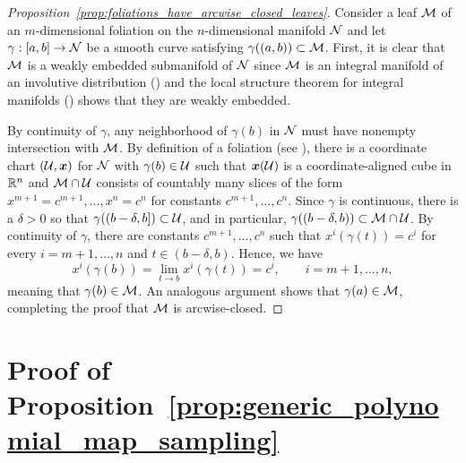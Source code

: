 \documentclass[twoside,11pt]{article}
\begin{document}
\begin{proof}[Proposition~\ref{prop:foliations_have_arcwise_closed_leaves}]
    Consider a leaf ${\mathcal{M}}$ of an $m$-dimensional foliation on the $n$-dimensional manifold ${\mathcal{N}}$ and let $\gamma:[a,b] \to {\mathcal{N}}$ be a smooth curve satisfying $\gamma((a,b)) \subset {\mathcal{M}}$.
    First, it is clear that ${\mathcal{M}}$ is a weakly embedded submanifold of ${\mathcal{N}}$ since ${\mathcal{M}}$ is an integral manifold of an involutive distribution (\citet[Proposition~19.19]{Lee2013introduction}) and the local structure theorem for integral manifolds (\citet[Proposition~19.16]{Lee2013introduction}) shows that they are weakly embedded.
    
    By continuity of $\gamma$, any neighborhood of $\gamma(b)$ in ${\mathcal{N}}$ must have nonempty intersection with ${\mathcal{M}}$.
    By definition of a foliation (see \cite{Lee2013introduction}), there is a coordinate chart $({\mathcal{U}}, {\boldsymbol{x}})$ for ${\mathcal{N}}$ with $\gamma(b) \in {\mathcal{U}}$ such that ${\boldsymbol{x}}({\mathcal{U}})$ is a coordinate-aligned cube in $\mathbb{R}^n$ and ${\mathcal{M}} \cap {\mathcal{U}}$ consists of countably many slices of the form $x^{m+1} = c^{m+1}, \ldots, x^{n} = c^n$ for constants $c^{m+1}, \ldots, c^n$.
    Since $\gamma$ is continuous, there is a $\delta > 0$ so that $\gamma((b-\delta, b]) \subset {\mathcal{U}}$, and in particular, $\gamma((b-\delta, b)) \subset {\mathcal{M}} \cap {\mathcal{U}}$.
    By continuity of $\gamma$, there are constants $c^{m+1}, \ldots, c^n$ such that $x^{i}(\gamma(t)) = c^{i}$ for every $i=m+1,\ldots, n$ and $t \in (b-\delta, b)$.
    Hence, we have
    \begin{equation}
        x^i(\gamma(b)) = \lim_{t\to b} x^i(\gamma(t)) = c^i, \qquad i=m+1, \ldots, n,
    \end{equation}
    meaning that $\gamma(b) \in {\mathcal{M}}$.
    An analogous argument shows that $\gamma(a) \in {\mathcal{M}}$, completing the proof that ${\mathcal{M}}$ is arcwise-closed.
\end{proof}

\section{Proof of Proposition~\ref{prop:generic_polynomial_map_sampling}}
\label{app:generic_polynomial_map_sampling}
\end{document}
